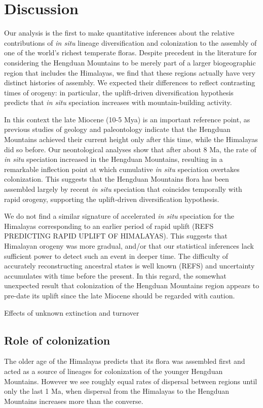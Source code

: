 \section{Discussion}

Our analysis is the first to make quantitative inferences about the relative contributions of \textit{in situ} lineage diversification and colonization to the assembly of one of the world's richest temperate floras. Despite precedent in the literature for considering the Hengduan Mountains to be merely part of a larger biogeographic region that includes the Himalayas, we find that these regions actually have very distinct histories of assembly. We expected their differences to reflect contrasting times of orogeny: in particular, the uplift-driven diversification hypothesis predicts that \textit{in situ} speciation increases with mountain-building activity.

In this context the late Miocene (10-5 Mya) is an important reference point, as previous studies of geology and paleontology indicate that the Hengduan Mountains achieved their current height only after this time, while the Himalayas did so before. Our neontological analyses show that after about 8 Ma, the rate of \textit{in situ} speciation increased in the Hengduan Mountains, resulting in a remarkable inflection point at which cumulative \textit{in situ} speciation overtakes colonization. This suggests that the Hengduan Mountains flora has been assembled largely by recent \textit{in situ} speciation that coincides temporally with rapid orogeny, supporting the uplift-driven diversification hypothesis.

We do not find a similar signature of accelerated \textit{in situ} speciation for the Himalayas corresponding to an earlier period of rapid uplift (REFS PREDICTING RAPID UPLIFT OF HIMALAYAS). This suggests that Himalayan orogeny was more gradual, and/or that our statistical inferences lack sufficient power to detect such an event in deeper time. The difficulty of accurately reconstructing ancestral states is well known (REFS) and uncertainty accumulates with time before the present. In this regard, the somewhat unexpected result that colonization of the Hengduan Mountains region appears to pre-date its uplift since the late Miocene should be regarded with caution.

Effects of unknown extinction and turnover

\subsection{Role of colonization}
The older age of the Himalayas predicts that its flora was assembled first and acted as a source of lineages for colonization of the younger Hengduan Mountains. However we see roughly equal rates of dispersal between regions until only the last 1 Ma, when dispersal from the Himalayas to the Hengduan Mountains increases more than the converse. 



